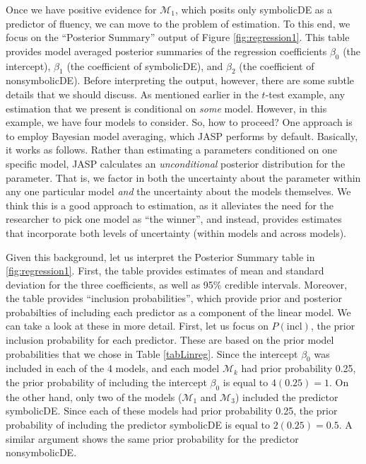 \documentclass[english,,doc,floatsintext]{apa6}
\begin{document}
Once we have positive evidence for \(\mathcal{M}_{1}\), which posits only symbolicDE as a predictor of fluency, we can move to the problem of estimation. To this end, we focus on the ``Posterior Summary'' output of Figure \ref{fig:regression1}. This table provides model averaged posterior summaries of the regression coefficients \(\beta_{0}\) (the intercept), \(\beta_{1}\) (the coefficient of symbolicDE), and \(\beta_{2}\) (the coefficient of nonsymbolicDE). Before interpreting the output, however, there are some subtle details that we should discuss. As mentioned earlier in the \(t\)-test example, any estimation that we present is conditional on \emph{some} model. However, in this example, we have four models to consider. So, how to proceed? One approach is to employ Bayesian model averaging, which JASP performs by default. Basically, it works as follows. Rather than estimating a parameters conditioned on one specific model, JASP calculates an \emph{unconditional} posterior distribution for the parameter. That is, we factor in both the uncertainty about the parameter within any one particular model \emph{and} the uncertainty about the models themselves. We think this is a good approach to estimation, as it alleviates the need for the researcher to pick one model as ``the winner'', and instead, provides estimates that incorporate both levels of uncertainty (within models and across models).

Given this background, let us interpret the Posterior Summary table in \ref{fig:regression1}. First, the table provides estimates of mean and standard deviation for the three coefficients, as well as 95\% credible intervals. Moreover, the table provides ``inclusion probabilities'', which provide prior and posterior probabilties of including each predictor as a component of the linear model. We can take a look at these in more detail. First, let us focus on \(P(\text{incl})\), the prior inclusion probability for each predictor. These are based on the prior model probabilities that we chose in Table \ref{tabLinreg}. Since the intercept \(\beta_{0}\) was included in each of the 4 models, and each model \(\mathcal{M}_{k}\) had prior probability 0.25, the prior probability of including the intercept \(\beta_{0}\) is equal to \(4(0.25) = 1\). On the other hand, only two of the models (\(\mathcal{M}_{1}\) and \(\mathcal{M}_{3}\)) included the predictor symbolicDE. Since each of these models had prior probability 0.25, the prior probability of including the predictor symbolicDE is equal to \(2(0.25) = 0.5\). A similar argument shows the same prior probability for the predictor nonsymbolicDE.
\end{document}
